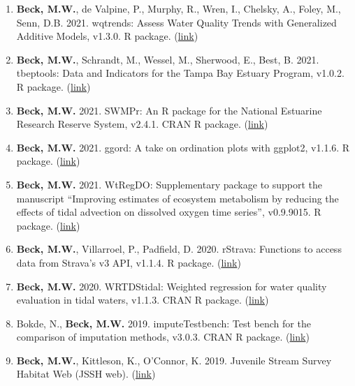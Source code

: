\documentclass[letterpaper,12pt]{article}
\begin{document}
\begin{enumerate}

\item \textbf{Beck, M.W.}, de Valpine, P., Murphy, R., Wren, I., Chelsky, A., Foley, M., Senn, D.B. 2021. wqtrends: Assess Water Quality Trends with Generalized Additive Models, v1.3.0. R package. ({\footnotesize\href{https://tbep-tech.github.io/wqtrends/}{link}})

\item \textbf{Beck, M.W.}, Schrandt, M., Wessel, M., Sherwood, E., Best, B. 2021. tbeptools: Data and Indicators for the Tampa Bay Estuary Program, v1.0.2. R package. ({\footnotesize\href{https://tbep-tech.github.io/tbeptools/}{link}})

\item \textbf{Beck, M.W.} 2021. SWMPr: An R package for the National Estuarine Research Reserve System, v2.4.1. CRAN R package. ({\footnotesize\href{https://cran.r-project.org/web/packages/SWMPr/index.html}{link}})

\item \textbf{Beck, M.W.} 2021. ggord: A take on ordination plots with ggplot2, v1.1.6. R package. ({\footnotesize\href{https://github.com/fawda123/ggord}{link}})

\item \textbf{Beck, M.W.} 2021. WtRegDO: Supplementary package to support the manuscript ``Improving estimates of ecosystem metabolism by reducing the effects of tidal advection on dissolved oxygen time series'', v0.9.9015. R package. ({\footnotesize\href{http://github.com/fawda123/WtRegDO}{link}})

\item \textbf{Beck, M.W.}, Villarroel, P., Padfield, D. 2020. rStrava: Functions to access data from Strava's v3 API, v1.1.4. R package. ({\footnotesize\href{https://github.com/fawda123/rStrava}{link}})

\item \textbf{Beck, M.W.} 2020. WRTDStidal: Weighted regression for water quality evaluation in tidal waters, v1.1.3. CRAN R package. ({\footnotesize\href{https://cran.r-project.org/web/packages/WRTDStidal/index.html}{link}})

\item Bokde, N., \textbf{Beck, M.W.} 2019. imputeTestbench: Test bench for the comparison of imputation methods, v3.0.3. CRAN R package. ({\footnotesize\href{https://cran.r-project.org/web/packages/imputeTestbench/index.html}{link}})

\item \textbf{Beck, M.W.}, Kittleson, K., O'Connor, K. 2019. Juvenile Stream Survey Habitat Web (JSSH web). ({\footnotesize\href{https://sccwrp.shinyapps.io/jssh_web/}{link}})


\end{enumerate}
\end{document}
